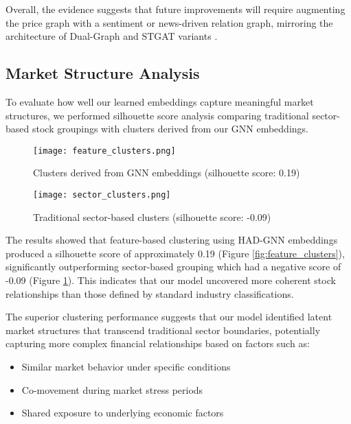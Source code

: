 \documentclass[12pt]{article}
\begin{document}
Overall, the evidence suggests that future improvements will require augmenting the price graph with a sentiment or news-driven relation graph, mirroring the architecture of Dual-Graph and STGAT variants \cite{du2023,liu2025}.  

\subsection{Market Structure Analysis}

To evaluate how well our learned embeddings capture meaningful market structures, we performed silhouette score analysis comparing traditional sector-based stock groupings with clusters derived from our GNN embeddings.

\begin{figure}[h]
    \centering
    \begin{minipage}{0.48\textwidth}
        \centering
        \texttt{[image: feature\_clusters.png]}
        \caption{Clusters derived from GNN embeddings (silhouette score: 0.19)}
        \label{fig:feature_clusters}
    \end{minipage}\hfill
    \begin{minipage}{0.48\textwidth}
        \centering
        \texttt{[image: sector\_clusters.png]}
        \caption{Traditional sector-based clusters (silhouette score: -0.09)}
        \label{fig:sector_clusters}
    \end{minipage}
\end{figure}

The results showed that feature-based clustering using HAD-GNN embeddings produced a silhouette score of approximately 0.19 (Figure \ref{fig:feature_clusters}), significantly outperforming sector-based grouping which had a negative score of -0.09 (Figure \ref{fig:sector_clusters}). This indicates that our model uncovered more coherent stock relationships than those defined by standard industry classifications.

The superior clustering performance suggests that our model identified latent market structures that transcend traditional sector boundaries, potentially capturing more complex financial relationships based on factors such as:

\begin{itemize}
    \item Similar market behavior under specific conditions
    \item Co-movement during market stress periods
    \item Shared exposure to underlying economic factors
\end{itemize}
\end{document}
